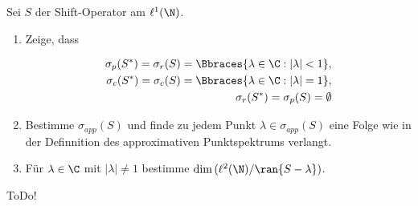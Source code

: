 \begin{exercise}[23/1]

Sei $S$ der Shift-Operator am $\ell^1(\N)$.

\begin{enumerate}[label = (\alph*)]

  \item
  Zeige, dass

  \begin{align*}
    \sigma_p(S^\ast) = \sigma_r(S) = \Bbraces{\lambda \in \C: |\lambda| < 1}, \\
    \sigma_c(S^\ast) = \sigma_c(S) = \Bbraces{\lambda \in \C: |\lambda| = 1}, \\
    \sigma_r(S^\ast) = \sigma_p(S) = \emptyset
  \end{align*}

  \item
  Bestimme $\sigma_{app}(S)$ und finde zu jedem Punkt $\lambda \in \sigma_{app}(S)$ eine Folge wie in der Definnition des approximativen Punktspektrums verlangt.

  \item
  Für $\lambda \in \C$ mit $|\lambda| \neq 1$ bestimme $\dim{(\ell^2(\N) / \ran{S - \lambda})}$.

\end{enumerate}

\end{exercise}

\begin{solution}

ToDo!

\end{solution}
